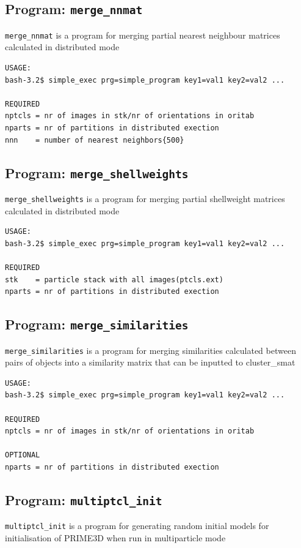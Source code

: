 \documentclass[a4paper,11pt]{article}
\newcommand{\prgname}[1]{\textcolor{NavyBlue}{\texttt{#1}}}
\begin{document}
\subsection{Program: \prgname{merge\_nnmat}}
\label{merge_nnmat}
\prgname{merge\_nnmat} is a program for merging partial nearest neighbour matrices calculated in distributed mode

\begin{verbatim}
USAGE:
bash-3.2$ simple_exec prg=simple_program key1=val1 key2=val2 ...

REQUIRED
nptcls = nr of images in stk/nr of orientations in oritab
nparts = nr of partitions in distributed exection
nnn    = number of nearest neighbors{500}
\end{verbatim}

\subsection{Program: \prgname{merge\_shellweights}}
\label{merge_shellweights}
\prgname{merge\_shellweights} is a program for merging partial shellweight matrices calculated in distributed mode

\begin{verbatim}
USAGE:
bash-3.2$ simple_exec prg=simple_program key1=val1 key2=val2 ...

REQUIRED
stk    = particle stack with all images(ptcls.ext)
nparts = nr of partitions in distributed exection
\end{verbatim}

\subsection{Program: \prgname{merge\_similarities}}
\label{merge_similarities}
\prgname{merge\_similarities} is a program for merging similarities calculated between pairs of objects into a similarity matrix that can be inputted to cluster\_smat

\begin{verbatim}
USAGE:
bash-3.2$ simple_exec prg=simple_program key1=val1 key2=val2 ...

REQUIRED
nptcls = nr of images in stk/nr of orientations in oritab

OPTIONAL
nparts = nr of partitions in distributed exection
\end{verbatim}

\subsection{Program: \prgname{multiptcl\_init}}
\label{multiptcl_init}
\prgname{multiptcl\_init} is a program for generating random initial models for initialisation of PRIME3D when run in multiparticle mode
\end{document}
